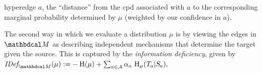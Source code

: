\documentclass[twoside]{article}
\begin{document}
hyperedge $a$, the ``distance'' from the cpd associated with $a$ to the
corresponding marginal probability determined by $\mu$ (weighted by
our confidence in $a$).


The second way in which we evaluate a distribution $\mu$ is 
by viewing  the edges in ${\dg M}$ as describing independent mechanisms
that determine the target given the source.  
This is captured by the \emph{information deficiency}, given by
$
    \IDef{\dg M}(\mu) := - \H(\mu) + \sum_{a \in \Ar} \alpha_a\, \H_\mu(\Tgt a | \Src a),
$
\end{document}
